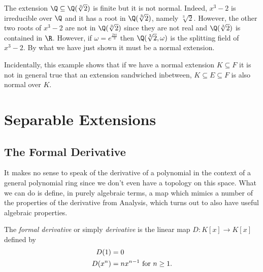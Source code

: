 \documentclass[12pt,oneside]{book}
\begin{document}
\begin{example}
	The extension \( \Q \subseteq \Q(\sqrt[3]{2}) \) is finite but it is not normal. Indeed,
	\( x^3 - 2 \) is irreducible over \( \Q \) and it has a root in \( \Q(\sqrt[3]{2}) \),
	namely \( \sqrt[3]{2} \). However, the other two roots of \( x^3 - 2 \) are not in \(
	\Q(\sqrt[3]{2}) \) since they are not real and \( \Q(\sqrt[3]{2}) \) is contained in \( \R
	\). However, if \( \omega = e^{\frac{2 \pi i}{3}} \) then \( \Q(\sqrt[3]{2}, \omega) \) is
	the splitting field of \( x^3 - 2 \). By what we have just shown it must be a normal
	extension.

	Incidentally, this example shows that if we have a normal extension \( K \subseteq F \) it
	is not in general true that an extension sandwiched inbetween, \( K \subseteq E \subseteq
	F\) is also normal over \( K \). 
\end{example}

\section{Separable Extensions}
\subsection{The Formal Derivative}
It makes no sense to speak of the derivative of a polynomial in the context of a general
polynomial ring since we don't even have a topology on this space. What we can do is
define, in purely algebraic terms, a map which mimics a number of the properties of the
derivative from Analysis, which turns out to also have useful algebraic properties. 
\begin{definition}
	The \emph{formal derivative} or simply \emph{derivative} is the linear map \( D \colon
	K[x] \to K[x] \) defined by
	\begin{align*}
		D(1) & = 0\\
		D(x^n) & = nx^{n-1} \text{ for \( n \geq 1 \)}.
	\end{align*}
\end{definition}
\end{document}
